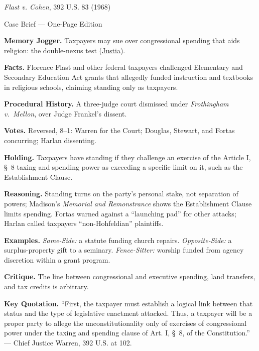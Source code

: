 \documentclass[12pt]{article}
\begin{document}
\begin{center}
{\Large \textit{Flast v. Cohen}, 392 U.S. 83 (1968)\par}
\vspace{0.3em}
{\normalsize Case Brief --- One-Page Edition\par}
\end{center}

\textbf{Memory Jogger.} Taxpayers may sue over congressional spending that aids religion: the double-nexus test (\href{https://supreme.justia.com/cases/federal/us/392/83/}{Justia}).

\textbf{Facts.} Florence Flast and other federal taxpayers challenged Elementary and Secondary Education Act grants that allegedly funded instruction and textbooks in religious schools, claiming standing only as taxpayers.

\textbf{Procedural History.} A three-judge court dismissed under \textit{Frothingham v.\ Mellon}, over Judge Frankel's dissent.

\textbf{Votes.} Reversed, 8--1: Warren for the Court; Douglas, Stewart, and Fortas concurring; Harlan dissenting.

\textbf{Holding.} Taxpayers have standing if they challenge an exercise of the Article I, \S\ 8 taxing and spending power as exceeding a specific limit on it, such as the Establishment Clause.

\textbf{Reasoning.} Standing turns on the party's personal stake, not separation of powers; Madison's \textit{Memorial and Remonstrance} shows the Establishment Clause limits spending. Fortas warned against a ``launching pad'' for other attacks; Harlan called taxpayers ``non-Hohfeldian'' plaintiffs.

\textbf{Examples.} \emph{Same-Side:} a statute funding church repairs. \emph{Opposite-Side:} a surplus-property gift to a seminary. \emph{Fence-Sitter:} worship funded from agency discretion within a grant program.

\textbf{Critique.} The line between congressional and executive spending, land transfers, and tax credits is arbitrary.

\textbf{Key Quotation.} ``First, the taxpayer must establish a logical link between that status and the type of legislative enactment attacked. Thus, a taxpayer will be a proper party to allege the unconstitutionality only of exercises of congressional power under the taxing and spending clause of Art. I, \S\ 8, of the Constitution.'' --- Chief Justice Warren, 392 U.S. at 102.
\end{document}
